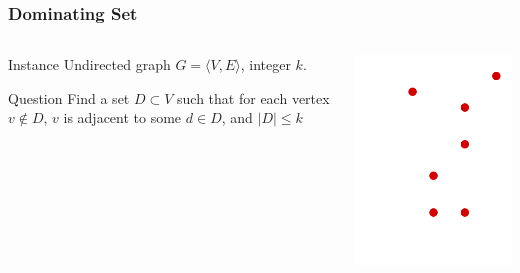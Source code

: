 \documentclass[12pt,aspectratio=169]{beamer}
\begin{document}
\begin{frame}\frametitle{Dominating Set }
\begin{columns} 
  \begin{column}{0.48\textwidth}
  \begin{block}{Instance}
    Undirected graph $G=\langle V,E \rangle$, integer $k$.
  \end{block}
  \begin{block}{Question}
    Find a set $D\subset V$ such that for each vertex $v\notin D$, $v$ is adjacent to some
    $d\in D$, and $|D|\le k$
  \end{block}
\end{column}
    
    \begin{column}{0.48\textwidth}
      \centering
  \includegraphics[height=0.7\textheight]{img/Dominating-set}
\end{column}
\end{columns}
\end{frame}
\end{document}
